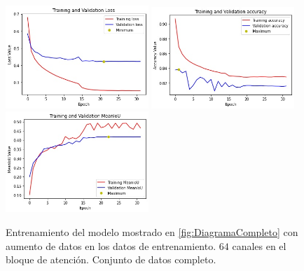 \begin{figure}[htpb]
  \centering
  \includegraphics[width=0.48\textwidth]{../../modelos-entrenados/unet-nonlocal/ejecucion7/loss}
  \includegraphics[width=0.48\textwidth]{../../modelos-entrenados/unet-nonlocal/ejecucion7/acc}
  \includegraphics[width=0.48\textwidth]{../../modelos-entrenados/unet-nonlocal/ejecucion7/iou}
  \caption{Entrenamiento del modelo mostrado en \autoref{fig:DiagramaCompleto} con aumento de datos en los datos de entrenamiento. $64$ canales en el bloque de atención. Conjunto de datos completo.}
  \label{fig:ejec7}
\end{figure}
